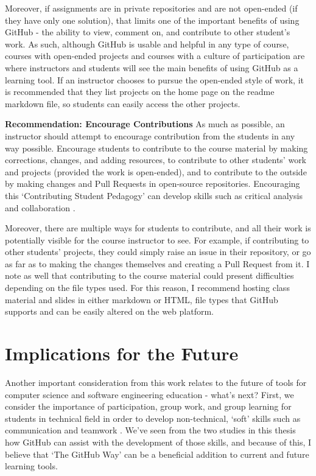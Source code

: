 \begin{itemize}
Moreover, if assignments are in private repositories and are not open-ended (if they have only one solution), that limits one of the important benefits of using GitHub - the ability to view, comment on, and contribute to other student's work. As such, although GitHub is usable and helpful in any type of course, courses with open-ended projects and courses with a culture of participation are where instructors and students will see the main benefits of using GitHub as a learning tool. If an instructor chooses to pursue the open-ended style of work, it is recommended that they list projects on the home page on the readme markdown file, so students can easily access the other projects.

\textbf{Recommendation: Encourage Contributions}
As much as possible, an instructor should attempt to encourage contribution from the students in any way possible. Encourage students to contribute to the course material by making corrections, changes, and adding resources, to contribute to other students' work and projects (provided the work is open-ended), and to contribute to the outside by making changes and Pull Requests in open-source repositories. Encouraging this `Contributing Student Pedagogy' can develop skills such as critical analysis and collaboration \cite{falkner2012supporting}.

Moreover, there are multiple ways for students to contribute, and all their work is potentially visible for the course instructor to see. For example, if contributing to other students' projects, they could simply raise an issue in their repository, or go as far as to making the changes themselves and creating a Pull Request from it. I note as well that contributing to the course material could present difficulties depending on the file types used. For this reason, I recommend hosting class material and slides in either markdown or HTML, file types that GitHub supports and can be easily altered on the web platform.

\section{Implications for the Future}
Another important consideration from this work relates to the future of tools for computer science and software engineering education - what's next? First, we consider the importance of participation, group work, and group learning for students in technical field in order to develop non-technical, `soft' skills such as communication and teamwork \cite{jazayeri2004education}. We've seen from the two studies in this thesis how GitHub can assist with the development of those skills, and because of this, I believe that `The GitHub Way' can be a beneficial addition to current and future learning tools.


\end{itemize}
